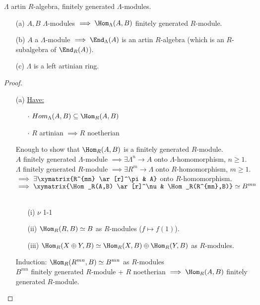 \begin{prop}
$\Lambda$ artin $R$-algebra, finitely generated $\Lambda$-modules.
\begin{enumerate}
\item[(a)] $A,B$ $\Lambda$-modules $\implies  \Hom_\Lambda(A,B)$ finitely generated $R$-module.

\item[(b)] $A$ a $\Lambda$-module $\implies \End_\Lambda(A)$ is an artin $R$-algebra (which is an $R$-subalgebra of $\End_R(A)$).

\item[(c)] $\Lambda$ is a left artinian ring.
\end{enumerate}

\begin{proof}
\begin{enumerate}
\item[(a)] \underline{Have:} \begin{enumerate}
\item[$\cdot$] $Hom_\Lambda(A,B) \subseteq \Hom_R(A,B)$
\item[$\cdot$] $R$ artinian $\implies R$ noetherian
\end{enumerate}
Enough to show that $\Hom_R(A,B)$ is a finitely generated $R$-module.\\
$A$ finitely generated $\Lambda$-module $\implies \exists \Lambda^n \to A$ onto $\Lambda$-homomorphism, $n \geq 1$.\\
$\Lambda$ finitely generated $R$-module $\implies \exists R^m \to \Lambda$ onto $R$-homomorphism, $m \geq 1$.\\
$\implies \exists \xymatrix{R^{mn} \ar[r]^\pi & A}$ onto $R$-homomorphism.\\
$\implies \xymatrix{\Hom_R(A,B) \ar[r]^\nu & \Hom_R(R^{mn},B)} \simeq B^{mn}$\\
\\
\begin{exer}
\begin{enumerate}
\item[(i)] $\nu$ 1-1
\item[(ii)] $\Hom_R(R,B) \simeq B$ as $R$-modules ($f \mapsto f(1)$).
\item[(iii)] $\Hom_R(X \oplus Y, B) \simeq \Hom_R(X,B) \oplus \Hom_R(Y,B)$ as $R$-modules.
\end{enumerate}
\end{exer}

Induction: $\Hom_R(R^{mn},B) \simeq B^{mn}$ as $R$-modules\\
$B^{mn}$ finitely generated $R$-module + $R$ noetherian $\implies \Hom_R(A,B)$ finitely generated $R$-module.


\end{enumerate}
\end{proof}
\end{prop}
